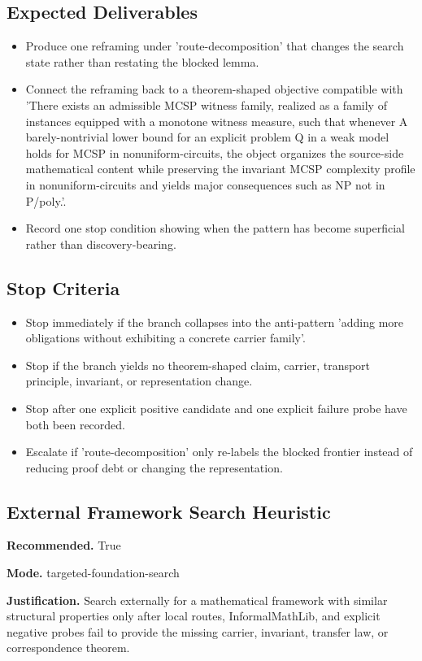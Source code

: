 \documentclass[11pt]{article}
\begin{document}
\subsection*{Expected Deliverables}
\begin{itemize}[leftmargin=*,itemsep=0.2em]
\item Produce one reframing under 'route-decomposition' that changes the search state rather than restating the blocked lemma.
\item Connect the reframing back to a theorem-shaped objective compatible with 'There exists an admissible MCSP witness family, realized as a family of instances equipped with a monotone witness measure, such that whenever A barely-nontrivial lower bound for an explicit problem Q in a weak model holds for MCSP in nonuniform-circuits, the object organizes the source-side mathematical content while preserving the invariant MCSP complexity profile in nonuniform-circuits and yields major consequences such as NP not in P/poly.'.
\item Record one stop condition showing when the pattern has become superficial rather than discovery-bearing.
\end{itemize}
\subsection*{Stop Criteria}
\begin{itemize}[leftmargin=*,itemsep=0.2em]
\item Stop immediately if the branch collapses into the anti-pattern 'adding more obligations without exhibiting a concrete carrier family'.
\item Stop if the branch yields no theorem-shaped claim, carrier, transport principle, invariant, or representation change.
\item Stop after one explicit positive candidate and one explicit failure probe have both been recorded.
\item Escalate if 'route-decomposition' only re-labels the blocked frontier instead of reducing proof debt or changing the representation.
\end{itemize}
\subsection*{External Framework Search Heuristic}
\textbf{Recommended.} True

\textbf{Mode.} targeted-foundation-search

\textbf{Justification.} Search externally for a mathematical framework with similar structural properties only after local routes, InformalMathLib, and explicit negative probes fail to provide the missing carrier, invariant, transfer law, or correspondence theorem.
\end{document}
